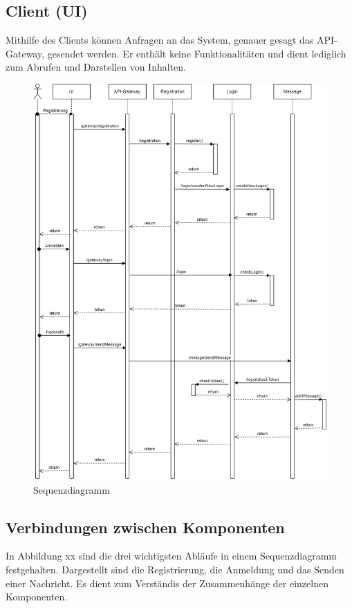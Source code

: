 \subsection{Client (UI)}
Mithilfe des Clients können Anfragen an das System, genauer gesagt das API-Gateway, gesendet werden. Er enthält keine Funktionalitäten und dient lediglich zum Abrufen und Darstellen von Inhalten.

\begin{figure}[bth] 
	\centering
	\includegraphics[width=1\textwidth]{Graphics/test2.png}
	\caption{Sequenzdiagramm}
\end{figure}

\subsection{Verbindungen zwischen Komponenten}
In Abbildung xx sind die drei wichtigsten Abläufe in einem Sequenzdiagramm festgehalten. Dargestellt sind die Registrierung, die Anmeldung und das Senden einer Nachricht. Es dient zum Verständis der Zusammenhänge der einzelnen Komponenten.


